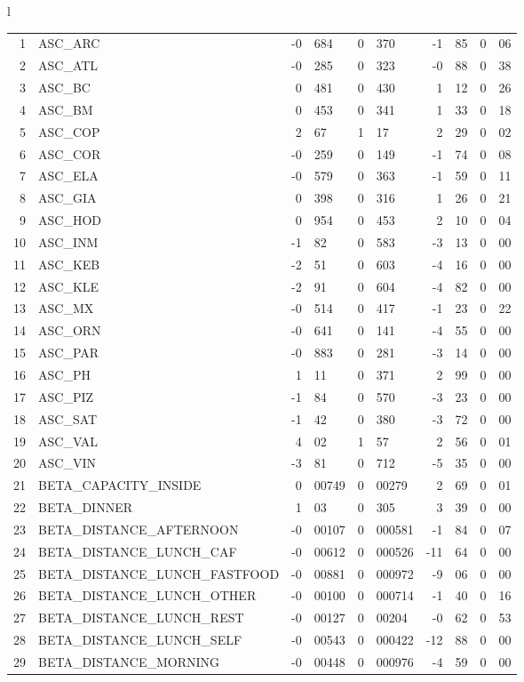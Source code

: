 \begin{tabular}{l}
\begin{tabular}{rlr@{.}lr@{.}lr@{.}lr@{.}l}
1 & ASC_ARC & -0&684 & 0&370 & -1&85 & 0&06\\
2 & ASC_ATL  & -0&285 & 0&323 & -0&88 & 0&38\\
3 & ASC_BC & 0&481 & 0&430 & 1&12 & 0&26\\
4 & ASC_BM  & 0&453 & 0&341 & 1&33 & 0&18\\
5 & ASC_COP & 2&67 & 1&17 & 2&29 & 0&02\\
6 & ASC_COR  & -0&259 & 0&149 & -1&74 & 0&08\\
7 & ASC_ELA  & -0&579 & 0&363 & -1&59 & 0&11\\
8 & ASC_GIA  & 0&398 & 0&316 & 1&26 & 0&21\\
9 & ASC_HOD  & 0&954 & 0&453 & 2&10 & 0&04\\
10 & ASC_INM  & -1&82 & 0&583 & -3&13 & 0&00\\
11 & ASC_KEB  & -2&51 & 0&603 & -4&16 & 0&00\\
12 & ASC_KLE & -2&91 & 0&604 & -4&82 & 0&00\\
13 & ASC_MX  & -0&514 & 0&417 & -1&23 & 0&22\\
14 & ASC_ORN  & -0&641 & 0&141 & -4&55 & 0&00\\
15 & ASC_PAR  & -0&883 & 0&281 & -3&14 & 0&00\\
16 & ASC_PH  & 1&11 & 0&371 & 2&99 & 0&00\\
17 & ASC_PIZ  & -1&84 & 0&570 & -3&23 & 0&00\\
18 & ASC_SAT  & -1&42 & 0&380 & -3&72 & 0&00\\
19 & ASC_VAL  & 4&02 & 1&57 & 2&56 & 0&01\\
20 & ASC_VIN & -3&81 & 0&712 & -5&35 & 0&00\\
21 & BETA_CAPACITY_INSIDE & 0&00749 & 0&00279 & 2&69 & 0&01\\
22 & BETA_DINNER & 1&03 & 0&305 & 3&39 & 0&00\\
23 & BETA_DISTANCE_AFTERNOON & -0&00107 & 0&000581 & -1&84 & 0&07\\
24 & BETA_DISTANCE_LUNCH_CAF & -0&00612 & 0&000526 & -11&64 & 0&00\\
25 & BETA_DISTANCE_LUNCH_FASTFOOD & -0&00881 & 0&000972 & -9&06 & 0&00\\
26 & BETA_DISTANCE_LUNCH_OTHER & -0&00100 & 0&000714 & -1&40 & 0&16\\
27 & BETA_DISTANCE_LUNCH_REST & -0&00127 & 0&00204 & -0&62 & 0&53\\
28 & BETA_DISTANCE_LUNCH_SELF & -0&00543 & 0&000422 & -12&88 & 0&00\\
29 & BETA_DISTANCE_MORNING & -0&00448 & 0&000976 & -4&59 & 0&00\\

\end{tabular}
\end{tabular}
